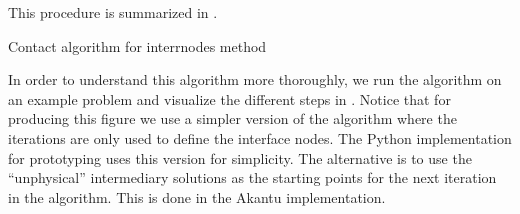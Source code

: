 \documentclass[11pt, a4paper]{article}
\begin{document}
This procedure is summarized in .

\begin{algorithm}
    \caption{Contact algorithm for interrnodes method}
    
    \label{alg:internodes}
\end{algorithm}

In order to understand this algorithm more thoroughly, we run the algorithm on an example problem and visualize the different steps in . Notice that for producing this figure we use a simpler version of the algorithm where the iterations are only used to define the interface nodes. The Python implementation for prototyping uses this version for simplicity. The alternative is to use the \enquote{unphysical} intermediary solutions as the starting points for the next iteration in the algorithm. This is done in the Akantu implementation.
\end{document}

